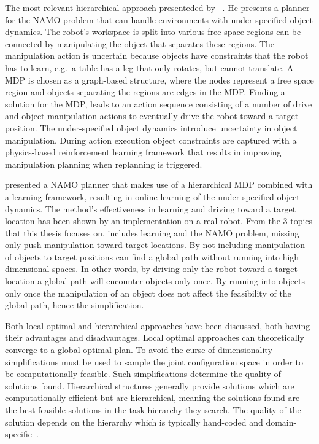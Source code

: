 The most relevant hierarchical approach presenteded by \citeauthor{scholz_navigation_2016}~\cite{scholz_navigation_2016}. He presents a planner for the \ac{NAMO} problem that can handle environments with under-specified object dynamics. The robot's workspace is split into various free space regions can be connected by manipulating the object that separates these regions. The manipulation action is uncertain because objects have constraints that the robot has to learn, e.g.~a table has a leg that only rotates, but cannot translate. A \ac{MDP} is chosen as a graph-based structure, where the nodes represent a free space region and objects separating the regions are edges in the \ac{MDP}. Finding a solution for the \ac{MDP}, leads to an action sequence consisting of a number of drive and object manipulation actions to eventually drive the robot toward a target position. The under-specified object dynamics introduce uncertainty in object manipulation. During action execution object constraints are captured with a physics-based reinforcement learning framework that results in improving manipulation planning when replanning is triggered.\bs

\citeauthor{scholz_navigation_2016} presented a \ac{NAMO} planner that makes use of a hierarchical \ac{MDP} combined with a learning framework, resulting in online learning of the under-specified object dynamics. The method's effectiveness in learning and driving toward a target location has been shown by an implementation on a real robot. From the 3 topics that this thesis focuses on, \citeauthor{scholz_navigation_2016} includes learning and the \ac{NAMO} problem, missing only push manipulation toward target locations. By not including manipulation of objects to target positions \citeauthor{scholz_navigation_2016} can find a global path without running into high dimensional spaces. In other words, by driving only the robot toward a target location a global path will encounter objects only once. By running into objects only once the manipulation of an object does not affect the feasibility of the global path, hence the simplification.\bs


Both local optimal and hierarchical approaches have been discussed, both having their advantages and disadvantages. Local optimal approaches can theoretically converge to a global optimal plan. To avoid the curse of dimensionality simplifications must be used to sample the joint configuration space in order to be computationally feasible. Such simplifications determine the quality of solutions found. Hierarchical structures generally provide solutions which are computationally efficient but are hierarchical, meaning the solutions found are the best feasible solutions in the task hierarchy they search. The quality of the solution depends on the hierarchy which is typically hand-coded and domain-specific~\cite{vega-brown_asymptotically_2020}.\bs

